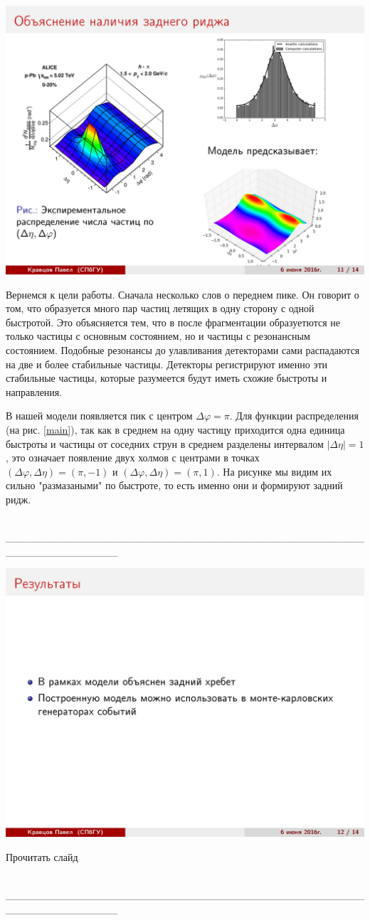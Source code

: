 \documentclass[14pt]{article}
\renewcommand{\phi}{\varphi}
\newcommand{\abs}[1]{\left| #1 \right|}
\renewcommand{\line}{\\ \_\_\_\_\_\_\_\_\_\_\_\_\_\_\_\_\_\_\_\_\_\_\_\_\_\_\_\_\_\_\_\_\_\_\_\_\_\_\_\_\_\_\_\_\_\_\_\_\_\_\_\_\_\_\_\_\_\_\_\_\_\_\_ \\ }
\begin{document}
\begin{minipage}[h]{0.3\linewidth}
\includegraphics[width=1\linewidth]{page-11.jpg}
\end{minipage}
\begin{minipage}[h]{0.65\linewidth}
Вернемся к цели работы. Сначала несколько слов о переднем пике. 
Он говорит о том, что образуется много пар частиц летящих в одну сторону с одной быстротой. Это объясняется тем, что в после фрагментации образуетются не только частицы с основным состоянием, но и частицы с резонансным состоянием. Подобные резонансы до улавливания детекторами сами распадаются на две и более стабильные частицы. Детекторы регистрируют именно эти стабильные частицы, которые разумеется будут иметь схожие быстроты и направления.

В нашей модели появляется пик с центром $\Delta \phi = \pi$. Для  функции распределения (на рис. \ref{main}), так как в среднем на одну частицу приходится одна единица быстроты и частицы от соседних струн в среднем разделены интервалом $\abs{\Delta \eta} = 1$, это означает появление двух холмов с центрами в точках $(\Delta \phi , \Delta \eta) = (\pi, -1)$ и $(\Delta \phi , \Delta \eta) = (\pi, 1)$. На рисунке мы видим их сильно "размазаными" по быстроте, то есть именно они и формируют задний ридж.
\end{minipage}
\line

\begin{minipage}[h]{0.5\linewidth}
\includegraphics[width=1\linewidth]{page-12.jpg}
\end{minipage}
\begin{minipage}[h]{0.45\linewidth}
Прочитать слайд
\end{minipage}
\line
\end{document}
